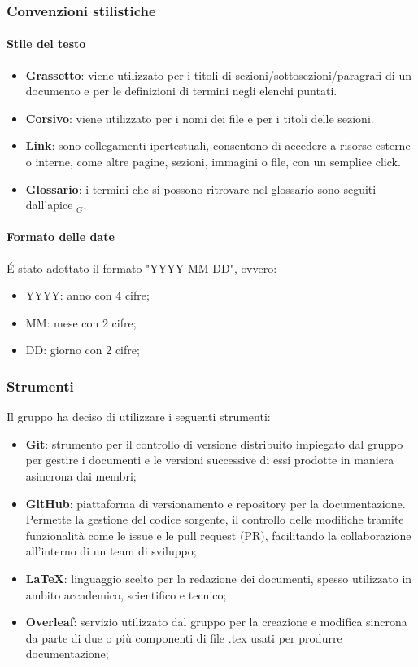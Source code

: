 \subsubsection{Convenzioni stilistiche}
    \paragraph{Stile del testo}
    \begin{itemize}
        \item \textbf{Grassetto}: viene utilizzato per i titoli di sezioni/sottosezioni/paragrafi di un documento e per le definizioni di termini negli elenchi puntati.
        \item \textbf{Corsivo}: viene utilizzato per i nomi dei file e per i titoli delle sezioni.
        \item \textbf{Link}: sono collegamenti ipertestuali, consentono di accedere a risorse esterne o interne, come altre pagine, sezioni, immagini o file, con un semplice click.
        \item \textbf{Glossario}: i termini che si possono ritrovare nel glossario sono seguiti dall'apice $_G$.
    \end{itemize}

    \paragraph{Formato delle date}
    \'E stato adottato il formato "YYYY-MM-DD", ovvero:
    \begin{itemize}
        \item YYYY: anno con 4 cifre;
        \item MM: mese con 2 cifre;
        \item DD: giorno con 2 cifre;
    \end{itemize}

\subsubsection{Strumenti}
Il gruppo ha deciso di utilizzare i seguenti strumenti:
\begin{itemize}
    \item \textbf{Git}: strumento per il controllo di versione distribuito impiegato dal gruppo per gestire i documenti e le versioni successive di essi prodotte in maniera asincrona dai membri;
    \item \textbf{GitHub}: piattaforma di versionamento e repository per la documentazione. Permette la gestione del codice sorgente, il controllo delle modifiche tramite funzionalità come le issue e le pull request (PR), facilitando la collaborazione all’interno di un team di sviluppo;
    \item \textbf{\LaTeX}: linguaggio scelto per la redazione dei documenti, spesso utilizzato in ambito accademico, scientifico e tecnico;
    \item \textbf{Overleaf}: servizio utilizzato dal gruppo per la creazione e modifica sincrona da parte di due o più componenti di file .tex usati per produrre documentazione;
\end{itemize}